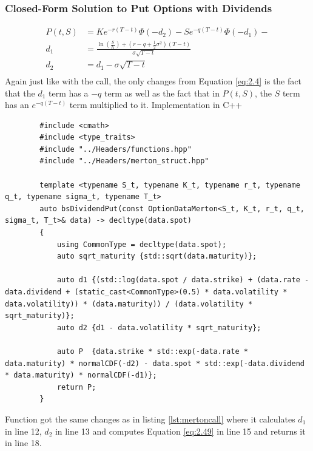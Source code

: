 \documentclass[12pt]{article}
\numberwithin{equation}{section}
\begin{document}
\subsubsection{Closed-Form Solution to Put Options with Dividends}
\begin{equation}
	\begin{aligned}
		P(t,S) &= Ke^{-r(T-t)}\Phi(-d_2)  - Se^{-q(T-t)}\Phi(-d_1) - \\
		d_1 &= \frac{\ln(\frac{S}{K}) + (r - q + \frac{1}{2}\sigma^2)(T-t)}{\sigma\sqrt{T-t}} \\ 
		d_2 &= d_1 - \sigma\sqrt{T-t} \\ 
	\end{aligned}
	\label{eq:2.49}
\end{equation} \cite{buchanan2014ExtensionsBS}
Again just like with the call, the only changes from Equation \ref{eq:2.4} is the fact that the $d_1$ term has a $-q$ term as well as the fact that in $P(t,S)$, the $S$ term has an $e^{-q(T-t)}$ term multiplied to it.
\newline \newline
Implementation in C++
\begin{listing}[ht]
	\begin{verbatim}
		#include <cmath>
		#include <type_traits>
		#include "../Headers/functions.hpp"
		#include "../Headers/merton_struct.hpp"
		
		template <typename S_t, typename K_t, typename r_t, typename q_t, typename sigma_t, typename T_t>
		auto bsDividendPut(const OptionDataMerton<S_t, K_t, r_t, q_t, sigma_t, T_t>& data) -> decltype(data.spot)
		{
			using CommonType = decltype(data.spot);
			auto sqrt_maturity {std::sqrt(data.maturity)};
			
			auto d1 {(std::log(data.spot / data.strike) + (data.rate - data.dividend + (static_cast<CommonType>(0.5) * data.volatility * data.volatility)) * (data.maturity)) / (data.volatility * sqrt_maturity)};
			auto d2 {d1 - data.volatility * sqrt_maturity};
			
			auto P  {data.strike * std::exp(-data.rate * data.maturity) * normalCDF(-d2) - data.spot * std::exp(-data.dividend * data.maturity) * normalCDF(-d1)};
			return P;
		}
	\end{verbatim}
	\caption{Black-76 Call using Closed Form Solution}
	\label{lst:mertonput}
\end{listing}
\FloatBarrier
Function got the same changes as in listing \ref{lst:mertoncall} where it calculates $d_1$ in line 12, $d_2$ in line 13 and computes Equation \ref{eq:2.49}  in line 15 and returns it in line 18.
\end{document}
